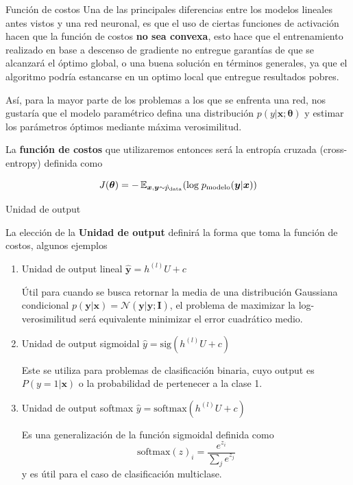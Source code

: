 \documentclass[9pt]{beamer}
\begin{document}
\begin{frame}{Función de costos}
Una de las principales diferencias entre los modelos lineales antes vistos y una red neuronal, es que el uso de ciertas funciones de activación hacen que la función de costos \textbf{no sea convexa}, esto hace que el entrenamiento realizado en base a descenso de gradiente no entregue garantías de que se alcanzará el óptimo global, o una buena solución en términos generales, ya que el algoritmo podría estancarse en un optimo local que entregue resultados pobres. \pause 
\vspace{0.2cm}

Así, para la mayor parte de los problemas a los que se enfrenta una red, nos gustaría que el modelo paramétrico defina una distribución $p(y|\bm{x}; \bm{\theta})$ y estimar los parámetros óptimos mediante máxima verosimilitud. \pause

La \textbf{función de costos} que utilizaremos entonces será la entropía cruzada (cross-entropy) definida como \pause 

\begin{equation*}
J(\bm{\theta}) = -\operatorname{\mathbb{E}}_{\bm{x},\bm{y}\sim \hat{p}_{\textrm{data}}}(\textrm{log}\; p_{\textrm{modelo}}(\bm{y}|\bm{x}))
\end{equation*}


\end{frame}
     
\begin{frame}{Unidad de output}

La elección de la \textbf{Unidad de output} definirá la forma que toma la función de costos, algunos ejemplos 
\begin{enumerate}
  \item Unidad de output lineal $\hat{\bm{y}} = h^{(l)}U + c$ \pause

  Útil para cuando se busca retornar la media de una distribución Gaussiana condicional $p(\bm{y}|\bm{x}) = \mathcal{N}(\bm{y}|\hat{\bm{y}};\bm{I})$, el problema de maximizar la log-verosimilitud será equivalente minimizar el error cuadrático medio. \pause

  \item Unidad de output sigmoidal $\hat{{y}} = \text{sig}(h^{(l)}U + c)$ \pause

  Este se utiliza para problemas de clasificación binaria, cuyo output es $P(y=1|\bm{x})$ o la probabilidad de pertenecer a la clase 1. \pause

  \item Unidad de output softmax $\hat{{y}} = \text{softmax}(h^{(l)}U + c)$ \pause 

  Es una generalización de la función sigmoidal definida como 
  \begin{equation*}
  \text{softmax}(z)_i = \frac{e^{z_i}}{\sum_{j}e^{z_j}}
  \end{equation*}
  y es útil para el caso de clasificación multiclase. 
\end{enumerate}

\end{frame}

\begin{frame}
  \titlepage
\end{frame}


%
\end{document}
